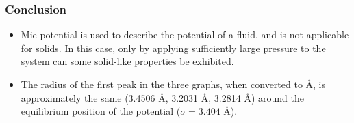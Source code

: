 \documentclass[10pt,t]{beamer}
\begin{document}
\begin{frame}
    \frametitle{Conclusion}
    \begin{itemize}
    \vspace{-0.6em}
    \setlength\itemsep{1em}
        \item Mie potential is used to describe the potential of a fluid, and is not applicable \\ for solids. In this case, only by applying sufficiently large pressure to the system can some solid-like properties be exhibited.
        \item The radius of the first peak in the three graphs, when converted to \AA, is approximately the same (3.4506 \AA, 3.2031 \AA, 3.2814 \AA) around the equilibrium position of the potential  ($\sigma = 3.404$ \AA).
    \end{itemize}
\end{frame}
\end{document}

